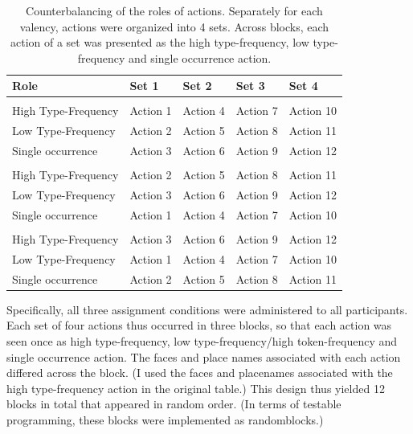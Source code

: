 \documentclass[
]{article}
\begin{document}
\begin{longtable}[t]{lllll}
\caption{\label{tab:counterbalancing-frequency-conditions-print}Counterbalancing of the roles of actions. Separately for each valency, actions were organized into 4 sets. Across blocks, each action of a set was presented as the high type-frequency, low type-frequency and single occurrence action.}\\
\toprule
Role & Set 1 & Set 2 & Set 3 & Set 4\\
\midrule
\addlinespace[0.3em]
\multicolumn{5}{l}{\textbf{Condition 1}}\\
\hspace{1em}High Type-Frequency & Action 1 & Action 4 & Action 7 & Action 10\\
\hspace{1em}Low Type-Frequency & Action 2 & Action 5 & Action 8 & Action 11\\
\hspace{1em}Single occurrence & Action 3 & Action 6 & Action 9 & Action 12\\
\addlinespace[0.3em]
\multicolumn{5}{l}{\textbf{Condition 2}}\\
\hspace{1em}High Type-Frequency & Action 2 & Action 5 & Action 8 & Action 11\\
\hspace{1em}Low Type-Frequency & Action 3 & Action 6 & Action 9 & Action 12\\
\hspace{1em}Single occurrence & Action 1 & Action 4 & Action 7 & Action 10\\
\addlinespace[0.3em]
\multicolumn{5}{l}{\textbf{Condition 3}}\\
\hspace{1em}High Type-Frequency & Action 3 & Action 6 & Action 9 & Action 12\\
\hspace{1em}Low Type-Frequency & Action 1 & Action 4 & Action 7 & Action 10\\
\hspace{1em}Single occurrence & Action 2 & Action 5 & Action 8 & Action 11\\
\bottomrule
\end{longtable}

Specifically, all three assignment conditions were administered to all
participants. Each set of four actions thus occurred in three blocks, so
that each action was seen once as high type-frequency, low
type-frequency/high token-frequency and single occurrence action. The
faces and place names associated with each action differed across the
block. (I used the faces and placenames associated with the high
type-frequency action in the original table.) This design thus yielded
12 blocks in total that appeared in random order. (In terms of testable
programming, these blocks were implemented as randomblocks.)
\end{document}
